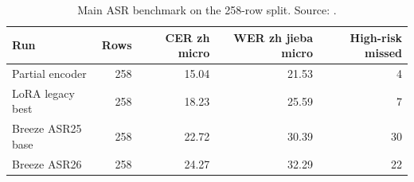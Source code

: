 \begin{table}[htbp]
\centering
\caption{Main ASR benchmark on the 258-row split. Source: .}
\label{tab:asr_benchmark}
\begin{tabular}{lrrrr}
\toprule
Run & Rows & CER zh micro & WER zh jieba micro & High-risk missed \\
\midrule
Partial encoder & 258 & 15.04 & 21.53 & 4 \\
LoRA legacy best & 258 & 18.23 & 25.59 & 7 \\
Breeze ASR25 base & 258 & 22.72 & 30.39 & 30 \\
Breeze ASR26 & 258 & 24.27 & 32.29 & 22 \\
\bottomrule
\end{tabular}
\end{table}
